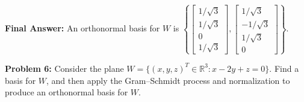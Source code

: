 \documentclass[11pt, letterpaper]{article}
\theoremstyle{definition}
\theoremstyle{remark}
\begin{document}
\textbf{Final Answer:} An orthonormal basis for $W$ is $\left\{ \begin{bmatrix} 1/\sqrt{3} \\ 1/\sqrt{3} \\ 0 \\ 1/\sqrt{3} \end{bmatrix}, \begin{bmatrix} 1/\sqrt{3} \\ -1/\sqrt{3} \\ 1/\sqrt{3} \\ 0 \end{bmatrix} \right\}$.

\vspace{0.8em}

\textbf{Problem 6:} Consider the plane $W = \{(x, y, z)^T \in \mathbb{R}^3 : x - 2y + z = 0\}$. Find a basis for $W$, and then apply the Gram--Schmidt process and normalization to produce an orthonormal basis for $W$.
\end{document}
